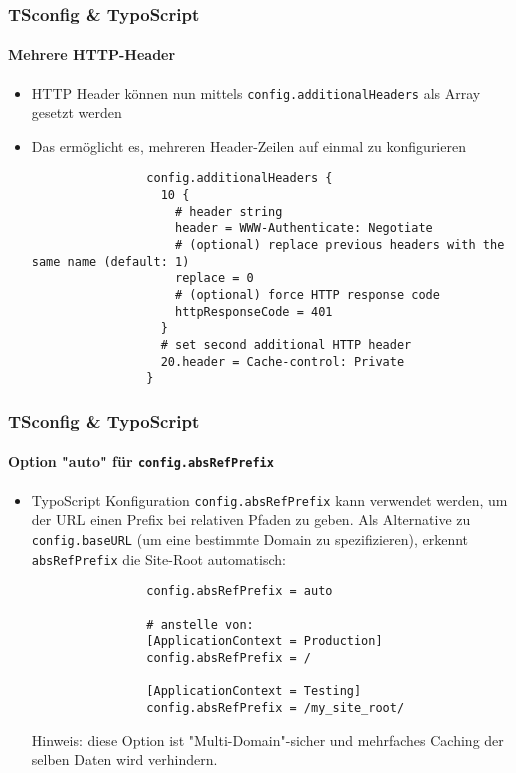 \begin{frame}[fragile]
	\frametitle{TSconfig \& TypoScript}
	\framesubtitle{Mehrere HTTP-Header}

	\begin{itemize}

		\item HTTP Header können nun mittels \small\texttt{config.additionalHeaders}\normalsize\newline
			als Array gesetzt werden
		\item Das ermöglicht es, mehreren Header-Zeilen auf einmal zu konfigurieren

			\begin{lstlisting}
				config.additionalHeaders {
				  10 {
				    # header string
				    header = WWW-Authenticate: Negotiate
				    # (optional) replace previous headers with the same name (default: 1)
				    replace = 0
				    # (optional) force HTTP response code
				    httpResponseCode = 401
				  }
				  # set second additional HTTP header
				  20.header = Cache-control: Private
				}
			\end{lstlisting}

	\end{itemize}

\end{frame}


\begin{frame}[fragile]
	\frametitle{TSconfig \& TypoScript}
	\framesubtitle{Option "auto" für \texttt{config.absRefPrefix}}

	\begin{itemize}
		\item TypoScript Konfiguration \texttt{config.absRefPrefix} kann verwendet werden,
			um der URL einen Prefix bei relativen Pfaden zu geben. Als Alternative zu
			\texttt{config.baseURL} (um eine bestimmte Domain zu spezifizieren),
			erkennt \texttt{absRefPrefix} die Site-Root automatisch:

			\begin{lstlisting}
				config.absRefPrefix = auto

				# anstelle von:
				[ApplicationContext = Production]
				config.absRefPrefix = /

				[ApplicationContext = Testing]
				config.absRefPrefix = /my_site_root/
			\end{lstlisting}

		\smaller
			Hinweis: diese Option ist "Multi-Domain"-sicher und mehrfaches
			Caching der selben Daten wird verhindern.
		\normalsize

	\end{itemize}

\end{frame}

